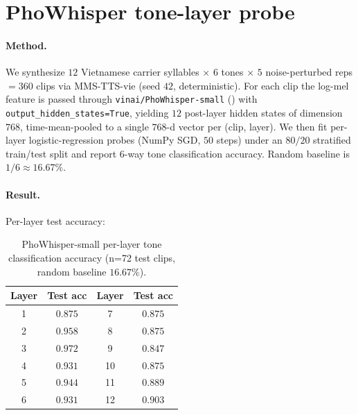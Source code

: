 \documentclass[a4paper,fleqn]{cas-dc}
\begin{document}
\section{PhoWhisper tone-layer probe}\label{app:phowhisper_probe}

\paragraph{Method.} We synthesize $12$ Vietnamese carrier syllables $\times$ $6$ tones $\times$ $5$ noise-perturbed reps $= 360$ clips via MMS-TTS-vie (seed $42$, deterministic). For each clip the log-mel feature is passed through \texttt{vinai/PhoWhisper-small} (\citealt{le2024phowhisper}) with \texttt{output\_hidden\_states=True}, yielding $12$ post-layer hidden states of dimension $768$, time-mean-pooled to a single $768$-d vector per (clip, layer). We then fit per-layer logistic-regression probes (NumPy SGD, $50$ steps) under an $80/20$ stratified train/test split and report $6$-way tone classification accuracy. Random baseline is $1/6 \approx 16.67\%$.

\paragraph{Result.} Per-layer test accuracy:

\begin{table}[H]
\caption{PhoWhisper-small per-layer tone classification accuracy (n=72 test clips, random baseline $16.67\%$).}\label{tab:phowhisper_layers}
\footnotesize
\setlength{\tabcolsep}{6pt}
\begin{tabular}{@{}c c c c@{}}
\toprule
Layer & Test acc & Layer & Test acc \\
\midrule
1 & $0.875$            & 7 & $0.875$            \\
2 & $0.958$            & 8 & $0.875$            \\
3 & $\mathbf{0.972}$   & 9 & $0.847$            \\
4 & $0.931$            & 10 & $0.875$           \\
5 & $0.944$            & 11 & $0.889$           \\
6 & $0.931$            & 12 & $0.903$           \\
\bottomrule
\end{tabular}
\end{table}
\end{document}
